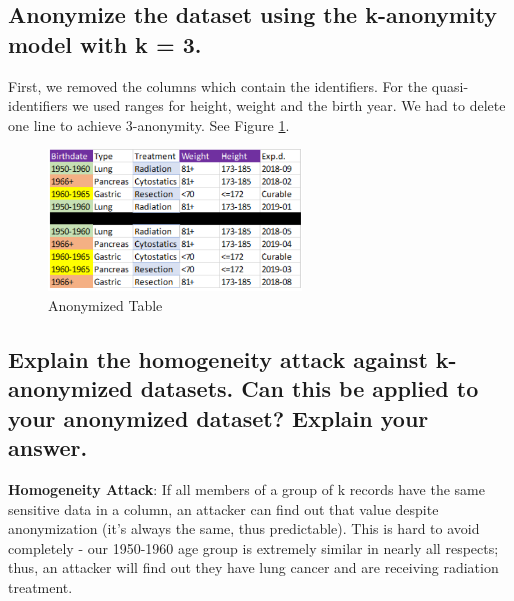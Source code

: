 \subsection{Anonymize the dataset using the k-anonymity model with k = 3.}

First, we removed the columns which contain the identifiers. For the quasi-identifiers we used ranges for height, weight and the birth year. We had to delete one line to achieve 3-anonymity. See Figure \ref{img:anotable}.

\begin{figure}[H]
	\centering
	\includegraphics[width=0.6\textwidth]{Assignment0x07/image/anonimyzed_table}
	\caption{Anonymized Table}
	\label{img:anotable}
\end{figure}

\subsection{Explain the homogeneity attack against k-anonymized datasets. Can this be applied to your anonymized dataset? Explain your answer.}

\textbf{Homogeneity Attack}: If all members of a group of k records have the same sensitive data in a column, an attacker can find out that value despite anonymization (it’s always the same, thus predictable). This is hard to avoid completely - our 1950-1960 age group is extremely similar in nearly all respects; thus, an attacker will find out they have lung cancer and are receiving radiation treatment. 
